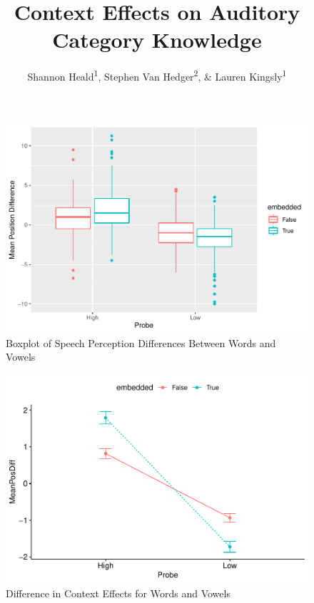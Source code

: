 \documentclass[
  man]{apa6}
\title{Context Effects on Auditory Category Knowledge}
\author{Shannon Heald\textsuperscript{1}, Stephen Van Hedger\textsuperscript{2}, \& Lauren Kingsly\textsuperscript{1}}
\date{}
\affiliation{\vspace{0.5cm}\textsuperscript{1} University of Chicago\\\textsuperscript{2} University of Western Ontario}
\begin{document}
\maketitle



\begin{figure}
\centering
\includegraphics{FinalScientificReport_files/figure-latex/GGPlotBoxplot-1.pdf}
\caption{\label{fig:GGPlotBoxplot}Boxplot of Speech Perception Differences Between Words and Vowels}
\end{figure}



\begin{figure}
\centering
\includegraphics{FinalScientificReport_files/figure-latex/GGPlotLine-1.pdf}
\caption{\label{fig:GGPlotLine}Difference in Context Effects for Words and Vowels}
\end{figure}
\end{document}
